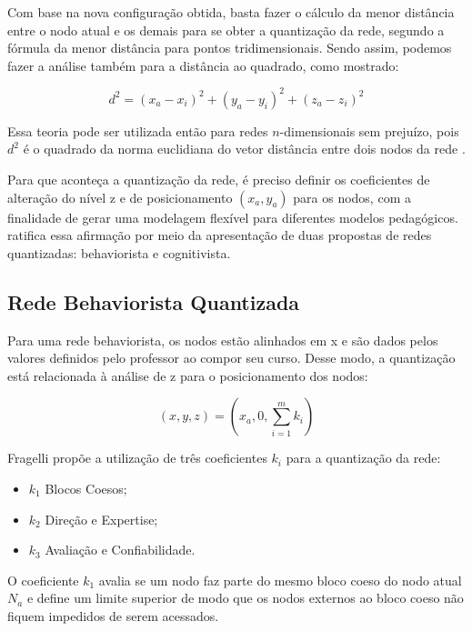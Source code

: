 Com base na nova configuração obtida, basta fazer o cálculo da menor distância entre o nodo atual e os demais para se obter a quantização da rede, segundo a fórmula da menor distância para pontos tridimensionais. Sendo assim, podemos fazer a análise também para a distância ao quadrado, como mostrado:

\begin{equation}
	d^2 = (x_a-x_i)^2 +(y_a-y_i)^2 + (z_a-z_i)^2 
\end{equation}

Essa teoria pode ser utilizada então para redes \(n\)-dimensionais sem prejuízo, pois \(d^2\) é o quadrado da norma euclidiana do vetor distância entre dois nodos da rede \cite{fragelli2010}.

Para que aconteça a quantização da rede, é preciso definir os coeficientes de alteração do nível z e de posicionamento \((x_a,y_a)\) para os nodos, com a finalidade de gerar uma modelagem flexível para diferentes modelos pedagógicos.  ratifica essa afirmação por meio da apresentação de duas propostas de redes quantizadas: behaviorista e cognitivista.

\subsection{Rede Behaviorista Quantizada}

Para uma rede behaviorista, os nodos estão alinhados em x e são dados pelos valores definidos pelo professor ao compor seu curso. Desse modo, a quantização está relacionada à análise de z para o posicionamento dos nodos:

\begin{equation}
	(x,y,z)=(x_a,0,\sum_{i=1}^{m} k_i ) 
\end{equation}

Fragelli propõe a utilização de três coeficientes \(k_i\) para a quantização da rede:

\begin{itemize}
	\item \(k_1\) Blocos Coesos;
 	\item \(k_2\) Direção e Expertise;
 	\item \(k_3\) Avaliação e Confiabilidade.
\end{itemize}

O coeficiente \(k_1\) avalia se um nodo faz parte do mesmo bloco coeso do nodo atual \(N_a\) e define um limite superior de modo que os nodos externos ao bloco coeso não fiquem impedidos de serem acessados.

